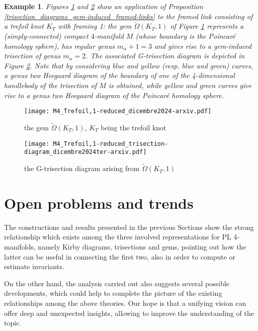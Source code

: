 \documentclass[12pt,a4paper]{article}
\newtheorem{example}{Example}
\begin{document}
\medskip

\begin{example}
{\em Figures \ref{fig:M4(trefoil,1)} and \ref{fig:M4(trefoil,1)_trisection-diagram} show an application of Proposition \ref{trisection_diagrams_gem-induced_framed-links} to the framed link consisting of a trefoil knot $K_T$ with framing 1: the gem $\tilde\Omega(K_T,1)$ of Figure \ref{fig:M4(trefoil,1)} represents a (simply-connected) compact $4$-manifold $M$ (whose boundary is the Poincar\'e homology sphere), has regular genus $m_\alpha +1 = 3$ and gives rise to a gem-induced trisection of genus $m_\alpha=2$. The associated G-trisection diagram is depicted in Figure \ref{fig:M4(trefoil,1)_trisection-diagram}. 
Note that by considering blue and yellow (resp. blue and green) curves, a genus two Heegaard diagram of the boundary of one of the 4-dimensional handlebody of the trisection  of $M$ is obtained, while yellow and green curves give rise to a genus two Heegaard diagram of the Poincar\'e homology sphere. 
}
\end{example}

\begin{figure} [ht]  %
    \centering
    \texttt{[image: M4\_Trefoil,1-reduced\_dicembre2024-arxiv.pdf]}
    \caption{the gem $\tilde\Omega(K_T,1)$, $K_T$ being the trefoil knot}
    \label{fig:M4(trefoil,1)} 
\end{figure}

 \begin{figure} [ht]   %
     \centering
     \texttt{[image: M4\_Trefoil,1-reduced\_trisection-diagram\_dicembre2024ter-arxiv.pdf]}
     \caption{the G-trisection diagram arising from $\tilde\Omega(K_T,1)$} 
     \label{fig:M4(trefoil,1)_trisection-diagram}
 \end{figure}

\bigskip

\section{Open problems and trends}

The constructions and results presented in the previous Sections show  
the strong relationship which exists among the three involved representations for PL 4-manifolds, namely Kirby diagrams, trisections and gems, pointing out how the latter can be useful in connecting the first two, also in order to compute or estimate invariants.      

On the other hand, the analysis carried out also suggests several possible developments, which could help to complete the picture of the existing relationships among the above theories. Our hope is that a unifying vision can offer deep and unexpected insights, allowing to improve the understanding of the topic.  
\end{document}

